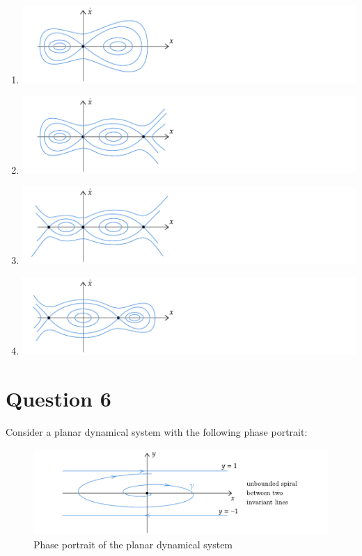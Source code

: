 \documentclass[twoside,10pt,a4paper]{article}
\begin{document}
\begin{enumerate}[label=(\alph*)]
	\item \includegraphics[scale=0.8]{Graphics/MCQ1_figures/Q21D02.pdf}
	\item \includegraphics[scale=0.8]{Graphics/MCQ1_figures/Q21D03.pdf}
	\item \includegraphics[scale=0.8]{Graphics/MCQ1_figures/Q21D04.pdf}
	\item \includegraphics[scale=0.8]{Graphics/MCQ1_figures/Q21D05.pdf}
\end{enumerate}

\section*{Question 6}
Consider a planar dynamical system with the following phase portrait:

\begin{figure}[H]
	\centering
	\includegraphics[scale=0.9]{Graphics/MCQ2_figures/Q04D01.pdf}
	\caption{Phase portrait of the planar dynamical system}
\end{figure}
\end{document}
